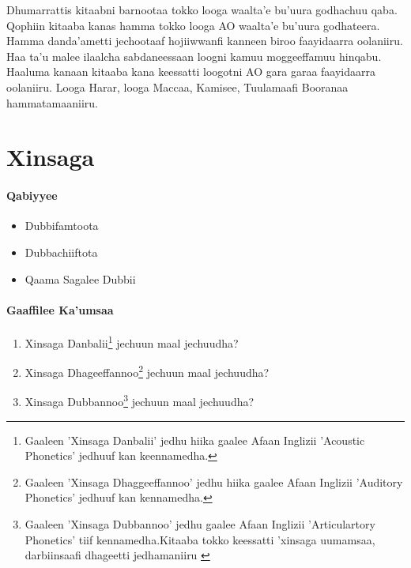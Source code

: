 \documentclass[11pt,b5paper]{book}
\begin{document}
Dhumarrattis kitaabni barnootaa tokko looga waalta’e bu’uura godhachuu qaba. Qophiin kitaaba kanas hamma tokko looga AO waalta’e bu’uura godhateera. Hamma danda’ametti
jechootaaf hojiiwwan\cite{aadaa1995}fi kanneen biroo faayidaarra oolaniiru. Haa ta’u malee ilaalcha sabdaneessaan loogni kamuu moggeeffamuu hinqabu. Haaluma kanaan
kitaaba kana keessatti loogotni AO gara garaa faayidaarra oolaniiru. Looga Harar, looga Maccaa, Kamisee, Tuulamaafi Booranaa hammatamaaniiru\cite{biniyam1988,griefenow2001grammatical,kebede1994}.


\chapter{Xinsaga}
\setlength{\parindent}{3em}
\subsubsection{Qabiyyee}
\begin{itemize}
  \item Dubbifamtoota
  \item Dubbachiiftota
  \item Qaama Sagalee Dubbii
\end{itemize}

\subsubsection{Gaaffilee Ka'umsaa}
\begin{enumerate}
  \item Xinsaga Danbalii\footnote{Gaaleen 'Xinsaga Danbalii' jedhu hiika gaalee Afaan Inglizii 'Acoustic Phonetics' jedhuuf kan keennamedha.} jechuun maal jechuudha?
  \item Xinsaga Dhageeffannoo\footnote{Gaaleen 'Xinsaga Dhaggeeffannoo' jedhu hiika gaalee Afaan Inglizii 'Auditory Phonetics' jedhuuf kan kennamedha.} jechuun maal jechuudha?
  \item Xinsaga Dubbannoo\footnote{Gaaleen 'Xinsaga Dubbannoo' jedhu gaalee Afaan Inglizii 'Articulartory Phonetics' tiif kennamedha.Kitaaba tokko keessatti 'xinsaga uumamsaa, darbiinsaafi dhageetti jedhamaniiru \cite[p.39]{Addunya2018}} jechuun maal jechuudha?
\end{enumerate}
\end{document}
